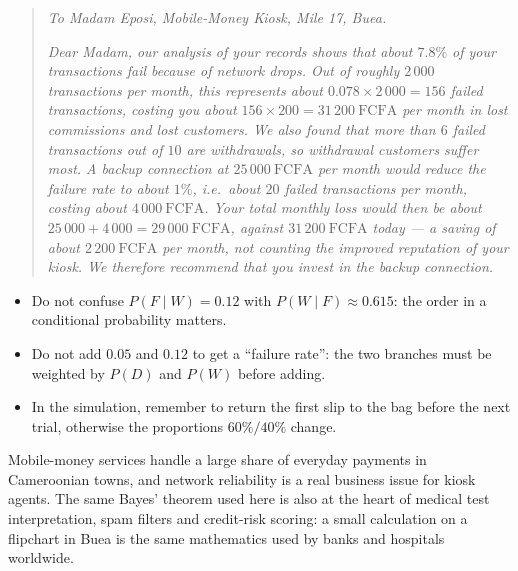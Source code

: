 \documentclass[11pt]{article}
\begin{document}
\begin{quote}
\emph{To Madam Eposi, Mobile-Money Kiosk, Mile 17, Buea.}

\emph{Dear Madam, our analysis of your records shows that about $7.8\%$ of your transactions fail because of network drops. Out of roughly $2\,000$ transactions per month, this represents about $0.078\times 2\,000=156$ failed transactions, costing you about $156\times 200=31\,200\ \mathrm{FCFA}$ per month in lost commissions and lost customers. We also found that more than $6$ failed transactions out of $10$ are withdrawals, so withdrawal customers suffer most. A backup connection at $25\,000\ \mathrm{FCFA}$ per month would reduce the failure rate to about $1\%$, i.e.\ about $20$ failed transactions per month, costing about $4\,000\ \mathrm{FCFA}$. Your total monthly loss would then be about $25\,000+4\,000=29\,000\ \mathrm{FCFA}$, against $31\,200\ \mathrm{FCFA}$ today — a saving of about $2\,200\ \mathrm{FCFA}$ per month, not counting the improved reputation of your kiosk. We therefore recommend that you invest in the backup connection.}
\end{quote}

\begin{attention}
\begin{itemize}
\item Do not confuse $P(F\mid W)=0.12$ with $P(W\mid F)\approx 0.615$: the order in a conditional probability matters.
\item Do not add $0.05$ and $0.12$ to get a ``failure rate'': the two branches must be weighted by $P(D)$ and $P(W)$ before adding.
\item In the simulation, remember to return the first slip to the bag before the next trial, otherwise the proportions $60\%/40\%$ change.
\end{itemize}
\end{attention}

\begin{savaistu}
Mobile-money services handle a large share of everyday payments in Cameroonian towns, and network reliability is a real business issue for kiosk agents. The same Bayes' theorem used here is also at the heart of medical test interpretation, spam filters and credit-risk scoring: a small calculation on a flipchart in Buea is the same mathematics used by banks and hospitals worldwide.
\end{savaistu}

\newpage
\end{document}
